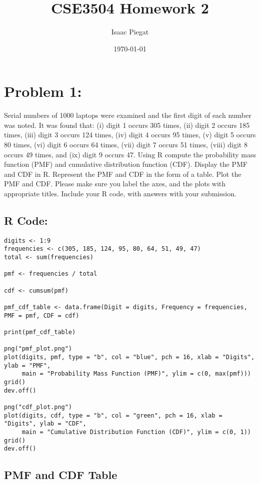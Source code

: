 \documentclass{article}
\title{CSE3504 Homework 2}
\author{Isaac Piegat}
\date{\today}
\begin{document}
\maketitle

\section{Problem 1:}
Serial numbers of 1000 laptops were examined and the first digit of each number was
noted. It was found that: (i) digit 1 occurs 305 times, (ii) digit 2 occurs 185 times, (iii) digit
3 occurs 124 times, (iv) digit 4 occurs 95 times, (v) digit 5 occurs 80 times, (vi) digit 6
occurs 64 times, (vii) digit 7 occurs 51 times, (viii) digit 8 occurs 49 times, and (ix) digit 9
occurs 47. Using R compute the probability mass function (PMF) and cumulative
distribution function (CDF). Display the PMF and CDF in R. Represent the PMF and CDF
in the form of a table. Plot the PMF and CDF. Please make sure you label the axes, and
the plots with appropriate titles. Include your R code, with answers with your submission. 

\subsection{R Code:}
\begin{lstlisting}[caption={R Code for PMF and CDF Calculation}]
digits <- 1:9
frequencies <- c(305, 185, 124, 95, 80, 64, 51, 49, 47)
total <- sum(frequencies)

pmf <- frequencies / total

cdf <- cumsum(pmf)

pmf_cdf_table <- data.frame(Digit = digits, Frequency = frequencies, PMF = pmf, CDF = cdf)

print(pmf_cdf_table)

png("pmf_plot.png")
plot(digits, pmf, type = "b", col = "blue", pch = 16, xlab = "Digits", ylab = "PMF", 
     main = "Probability Mass Function (PMF)", ylim = c(0, max(pmf)))
grid()
dev.off()

png("cdf_plot.png")
plot(digits, cdf, type = "b", col = "green", pch = 16, xlab = "Digits", ylab = "CDF", 
     main = "Cumulative Distribution Function (CDF)", ylim = c(0, 1))
grid()
dev.off()
\end{lstlisting}

\subsection{PMF and CDF Table}
\end{document}
